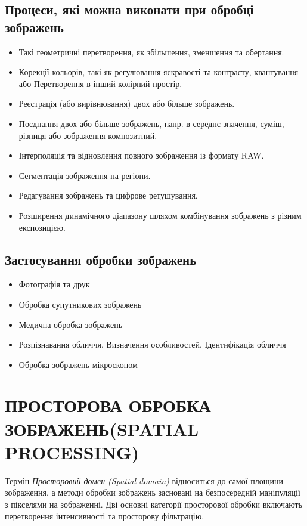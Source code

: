 \documentclass{article}
\begin{document}
    \subsection{Процеси, які можна виконати при обробці зображень}\label{subsec:image_preprocessing_options}
    \begin{itemize}
        \item Такі геометричні перетворення, як збільшення, зменшення та обертання.
        \item Корекції кольорів, такі як регулювання яскравості та контрасту, квантування або Перетворення в інший колірний простір.
        \item Реєстрація (або вирівнювання) двох або більше зображень.
        \item Поєднання двох або більше зображень, напр. в середнє значення, суміш, різниця або зображення композитний.
        \item Інтерполяція та відновлення повного зображення із формату RAW.
        \item Сегментація зображення на регіони.
        \item Редагування зображень та цифрове ретушування.
        \item Розширення динамічного діапазону шляхом комбінування зображень з різним експозицією.
    \end{itemize}

    \subsection{Застосування обробки зображень}\label{subsec:image_preprocessing_application}
    \begin{itemize}
        \item Фотографія та друк
        \item Обробка супутникових зображень
        \item Медична обробка зображень
        \item Розпізнавання обличчя, Визначення особливостей, Ідентифікація обличчя
        \item Обробка зображень мікроскопом
    \end{itemize}


    \section{ПРОСТОРОВА ОБРОБКА ЗОБРАЖЕНЬ(SPATIAL PROCESSING)}\label{sec:spatial_processing}
    Термін \emph{Просторовий домен (Spatial domain)} відноситься до самої площини зображення, а методи обробки зображень засновані на безпосередній маніпуляції з пікселями на зображенні.
    Дві основні категорії просторової обробки включають перетворення інтенсивності та просторову фільтрацію.
\end{document}
